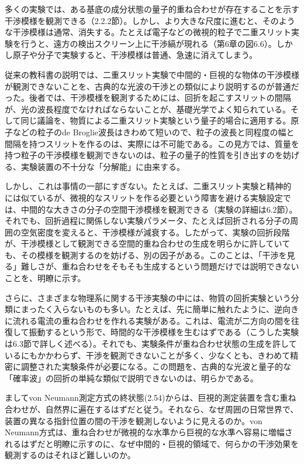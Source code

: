 

多くの実験では、ある基底の成分状態の量子的重ね合わせが存在することを示す干渉模様を観測できる（2.2.2節）。しかし、より大きな尺度に進むと、そのような干渉模様は通常、消失する。たとえば電子などの微視的粒子で二重スリット実験を行うと、遠方の検出スクリーン上に干渉縞が現れる（第6章の図6.6）。しかし原子や分子で実験すると、干渉模様は普通、急速に消えてしまう。

\hypertarget{srcpage:56}{}\label{srcpage:56}
従来の教科書の説明では、二重スリット実験で中間的・巨視的な物体の干渉模様が観測できないことを、古典的な光波の干渉との類似により説明するのが普通だった。後者では、干渉模様を観測するためには、回折を起こすスリットの間隔が、光の波長程度でなければならないことが、基礎光学でよく知られている。そして同じ議論を、物質による二重スリット実験という量子的場合に適用する。原子などの粒子のde Broglie波長はきわめて短いので、粒子の波長と同程度の幅と間隔を持つスリットを作るのは、実際には不可能である。この見方では、質量を持つ粒子の干渉模様を観測できないのは、粒子の量子的性質を引き出すのを妨げる、実験装置の不十分な「分解能」に由来する。

しかし、これは事情の一部にすぎない。たとえば、二重スリット実験と精神的には似ているが、微視的なスリットを作る必要という障害を避ける実験設定では、中間的な大きさの分子の空間干渉模様を観測できる（実験の詳細は6.2節）。それでも、回折過程に関係しない実験パラメータ、たとえば回折される分子の周囲の空気密度を変えると、干渉模様が減衰する。したがって、実験の回折段階が、干渉模様として観測できる空間的重ね合わせの生成を明らかに許していても、その模様を観測するのを妨げる、別の因子がある。このことは、「干渉を見る」難しさが、重ね合わせをそもそも生成するという問題だけでは説明できないことを、明瞭に示す。

さらに、さまざまな物理系に関する干渉実験の中には、物質の回折実験という分類にまったく入らないものも多い。たとえば、先に簡単に触れたように、逆向きに流れる電流の重ね合わせを作れる実験がある。これは、電流が二方向の間を往復して振動するという形で、時間的な干渉模様を生むはずである（こうした実験は6.3節で詳しく述べる）。それでも、実験条件が重ね合わせ状態の生成を許しているにもかかわらず、干渉を観測できないことが多く、少なくとも、きわめて精密に調整された実験条件が必要になる。この問題を、古典的な光波と量子的な「確率波」の回折の単純な類似で説明できないのは、明らかである。

ましてvon Neumann測定方式の終状態(2.54)からは、巨視的測定装置を含む重ね合わせが、自然界に遍在するはずだと従う。それなら、なぜ周囲の日常世界で、装置の異なる指針位置の間の干渉を観測しないように見えるのか。von Neumann方式は、重ね合わせが微視的な水準から巨視的な水準へ容易に増幅されるはずだと明瞭に示すのに、なぜ中間的・巨視的領域で、何らかの干渉効果を観測するのはそれほど難しいのか。

